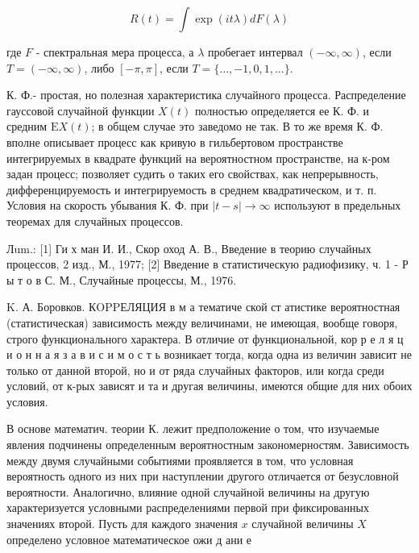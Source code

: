 \documentclass[10pt]{article}
\begin{document}
\[

R(t)=\int \exp (i t \lambda) d F(\lambda)

\]



где $F$ - спектральная мера процесса, а $\lambda$ пробегает интервал $(-\infty, \infty)$, если $T=(-\infty, \infty)$, либо $[-\pi, \pi]$, если $T=\{\ldots,-1,0,1, \ldots\}$.



К. Ф.- простая, но полезная характеристика случайного процесса. Распределение гауссовой случайной функции $X(t)$ полностью определяется ее К. Ф. и средним $\mathrm{E} X(t)$; в общем случае это заведомо не так. В то же время К. Ф. вполне описывает процесс как кривую в гильбертовом пространстве интегрируемых в квадрате функций на вероятностном пространстве, на к-ром задан процесс; позволяет судить о таких его свойствах, как непрерывность, дифференцируемость и интегрируемость в среднем квадратическом, и т. п. Условия на скорость убывания К. Ф. при $|t-s| \rightarrow \infty$ используют в предельных теоремах для случайных процессов.



Лum.: [1] Ги х ман И. И., Скор оход А. В., Введение в теорию случайных процессов, 2 изд., М., 1977; [2] Введение в статистическую радиофизику, ч. 1 - Р ы т о в С. М., Случайные процессы, М., 1976.

K. А. Боровков. КOPPЕЛЯЦИЯ в м а тематиче ской ст атистике вероятностная (статистическая) зависимость между величинами, не имеющая, вообще говоря, строго функционального характера. В отличие от функциональной, кор р е л я ц и о н н а я з а в и с и м о с т ь возникает тогда, когда одна из величин зависит не только от данной второй, но и от ряда случайных факторов, или когда среди условий, от к-рых зависят и та и другая величины, имеются общие для них обоих условия.



В основе математич. теории К. лежит предположение о том, что изучаемые явления подчинены определенным вероятностным закономерностям. Зависимость между двумя случайными событиями проявляется в том, что условная вероятность одного из них при наступлении другого отличается от безусловной вероятности. Аналогично, влияние одной случайной величины на другую характеризуется условными распределениями первой при фиксированных значениях второй. Пусть для каждого значения $x$ случайной величины $X$ определено условное математическое ожи д ани е
\end{document}
